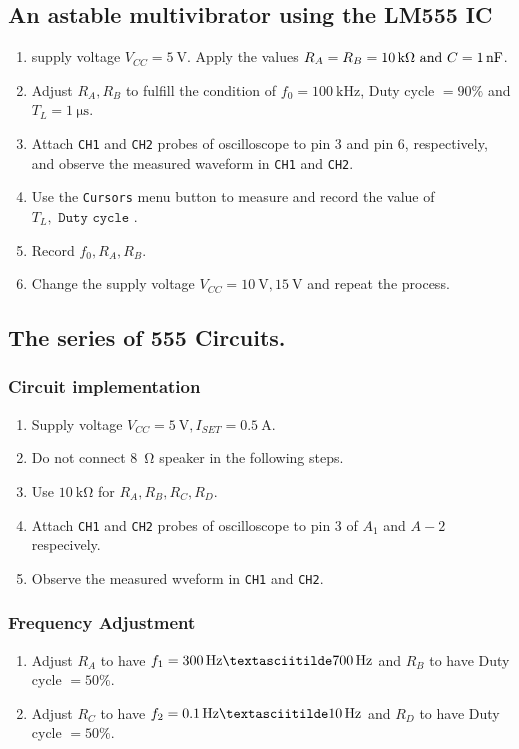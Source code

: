 \documentclass[12pt, a4paper]{article}
\begin{document}
\subsection{An astable multivibrator using the LM555 IC}

\begin{enumerate}[itemsep=0pt]
  \item supply voltage $V_{CC} = \SI{5}\V$. Apply the values
    $R_A = R_B = \SI{10}\kohm \text{ and } C = \SI{1}\nF$.
  \item Adjust $R_A, R_B$ to fulfill the condition of $f_0 = \SI{100}\kHz$, 
    Duty cycle $= 90\%$ and $T_L = \SI{1}\us$.
  \item Attach \texttt{CH1} and \texttt{CH2} probes of oscilloscope to
    pin 3 and pin 6, respectively, and observe the measured waveform
    in \texttt{CH1} and \texttt{CH2}.
  \item Use the \texttt{Cursors} menu button to measure and record the
    value of $T_L, \texttt{ Duty cycle }$.
  \item Record $f_0, R_A, R_B$.
  \item Change the supply voltage $V_{CC} = \SI{10}\V, \SI{15}\V$ and
    repeat the process.
\end{enumerate}

\subsection{The series of 555 Circuits.}
\subsubsection{Circuit implementation}
\begin{enumerate}[itemsep=0pt]
\item Supply voltage $V_{CC} = \SI{5}\V, I_{SET} = \SI{0.5}\A$.
\item Do not connect \SI{8}{\ohm} speaker in the following steps.
\item Use $\SI{10}\kohm$ for $R_A, R_B, R_C, R_D$.
\item Attach \texttt{CH1} and \texttt{CH2} probes of 
  oscilloscope to pin 3 of $A_1$ and $A-2$ respecively.
\item Observe the measured wveform in \texttt{CH1} and \texttt{CH2}.
\end{enumerate}
\subsubsection{Frequency Adjustment}
\begin{enumerate}[itemsep=0pt]
\item Adjust $R_A$ to have $f_1 = \SI{300}\Hz \textasciitilde \SI{700}\Hz$ and 
  $R_B$ to have Duty cycle $= 50\%$.
\item Adjust $R_C$ to have $f_2 = \SI{0.1}\Hz \textasciitilde \SI{10}\Hz$ and 
  $R_D$ to have Duty cycle $= 50\%$.
\end{enumerate}
\end{document}
